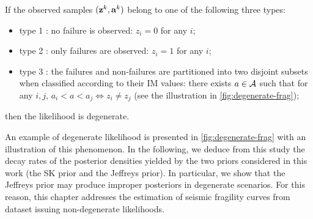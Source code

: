 \begin{defi}\label{def:degeneracy}
    If the observed samples $(\mathbf{z}^k,\mathbf{a}^k)$ belong to one of the following three types:
    \begin{itemize}
        \item {type 1 : no failure is observed: $z_i=0$ for any $i$;}
        \item {type 2 : only failures are observed: $z_i=1$ for any $i$;}
        \item {type 3 : the failures and non-failures are partitioned into two disjoint subsets when classified according to their IM values:}
        there exists $a\in\mathcal{A}$ such that for any $i,j$, $a_i<a<a_j\Longleftrightarrow z_i\ne z_j$ (see the illustration in \cref{fig:degenerate-frag});
    \end{itemize}
    then the likelihood is degenerate.
\end{defi}



An example of degenerate likelihood is presented in \cref{fig:degenerate-frag} with an illustration of this phenomenon.
In the following, we deduce from this study the decay rates of the posterior densities 
yielded by the two priors considered in this work (the SK prior and the Jeffreys prior).
In particular, we show that the Jeffreys prior may produce improper posteriors in degenerate scenarios.
For this reason, this chapter addresses the estimation of seismic fragility curves from dataset issuing non-degenerate likelihoods.


